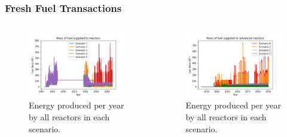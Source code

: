 \begin{frame}
    \frametitle{Fresh Fuel Transactions}
    \begin{columns}
        \column[t]{5cm}

        \column[t]{5cm}
        \vspace{-0.8cm}
        \begin{figure}
            \centering 
            \includegraphics[scale=0.3]{figures/fuelsupply_scenarios_all.png}
            \caption{Energy produced per year by all reactors in each scenario.}
            \label{fig:fuel_allRX}
        \end{figure}
        \vspace{-0.8cm}
        \begin{figure}
            \centering 
            \includegraphics[scale=0.3]{figures/advancedRX_fuelsupply_scenarios_2-5.png}
            \vspace{0cm}
            \caption{Energy produced per year by all reactors in each scenario.}
            \label{fig:fuel_advancedRX}
        \end{figure}
    \end{columns}
    

\end{frame}

